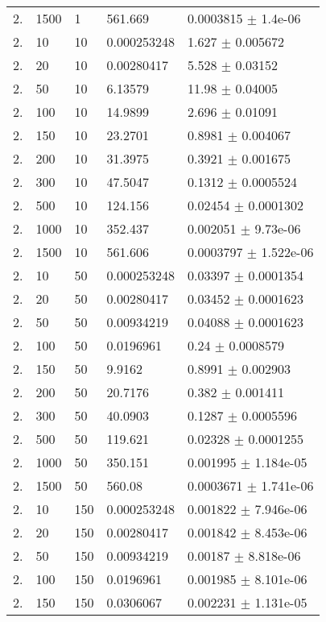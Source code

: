 \begin{longtable}{lllll}
  2. &  1500 &     1 &  561.669 & 0.0003815 $\pm$  1.4e-06 \\
  2. &    10 &    10 & 0.000253248 &    1.627 $\pm$ 0.005672 \\
  2. &    20 &    10 & 0.00280417 &    5.528 $\pm$  0.03152 \\
  2. &    50 &    10 &  6.13579 &    11.98 $\pm$  0.04005 \\
  2. &   100 &    10 &  14.9899 &    2.696 $\pm$  0.01091 \\
  2. &   150 &    10 &  23.2701 &   0.8981 $\pm$ 0.004067 \\
  2. &   200 &    10 &  31.3975 &   0.3921 $\pm$ 0.001675 \\
  2. &   300 &    10 &  47.5047 &   0.1312 $\pm$ 0.0005524 \\
  2. &   500 &    10 &  124.156 &  0.02454 $\pm$ 0.0001302 \\
  2. &  1000 &    10 &  352.437 & 0.002051 $\pm$ 9.73e-06 \\
  2. &  1500 &    10 &  561.606 & 0.0003797 $\pm$ 1.522e-06 \\
  2. &    10 &    50 & 0.000253248 &  0.03397 $\pm$ 0.0001354 \\
  2. &    20 &    50 & 0.00280417 &  0.03452 $\pm$ 0.0001623 \\
  2. &    50 &    50 & 0.00934219 &  0.04088 $\pm$ 0.0001623 \\
  2. &   100 &    50 & 0.0196961 &     0.24 $\pm$ 0.0008579 \\
  2. &   150 &    50 &   9.9162 &   0.8991 $\pm$ 0.002903 \\
  2. &   200 &    50 &  20.7176 &    0.382 $\pm$ 0.001411 \\
  2. &   300 &    50 &  40.0903 &   0.1287 $\pm$ 0.0005596 \\
  2. &   500 &    50 &  119.621 &  0.02328 $\pm$ 0.0001255 \\
  2. &  1000 &    50 &  350.151 & 0.001995 $\pm$ 1.184e-05 \\
  2. &  1500 &    50 &   560.08 & 0.0003671 $\pm$ 1.741e-06 \\
  2. &    10 &   150 & 0.000253248 & 0.001822 $\pm$ 7.946e-06 \\
  2. &    20 &   150 & 0.00280417 & 0.001842 $\pm$ 8.453e-06 \\
  2. &    50 &   150 & 0.00934219 &  0.00187 $\pm$ 8.818e-06 \\
  2. &   100 &   150 & 0.0196961 & 0.001985 $\pm$ 8.101e-06 \\
  2. &   150 &   150 & 0.0306067 & 0.002231 $\pm$ 1.131e-05 \\

\end{longtable}

